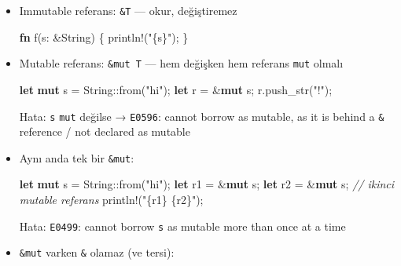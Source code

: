 \documentclass[12pt,a4paper]{article}
\newenvironment{Shaded}{}{}
\newcommand{\CommentTok}[1]{\textcolor[rgb]{0.38,0.63,0.69}{\textit{#1}}}
\newcommand{\DataTypeTok}[1]{\textcolor[rgb]{0.56,0.13,0.00}{#1}}
\newcommand{\FunctionTok}[1]{\textcolor[rgb]{0.02,0.16,0.49}{#1}}
\newcommand{\KeywordTok}[1]{\textcolor[rgb]{0.00,0.44,0.13}{\textbf{#1}}}
\newcommand{\NormalTok}[1]{#1}
\newcommand{\OperatorTok}[1]{\textcolor[rgb]{0.40,0.40,0.40}{#1}}
\newcommand{\StringTok}[1]{\textcolor[rgb]{0.25,0.44,0.63}{#1}}
\begin{document}
\begin{itemize}
\item
  Immutable referans: \texttt{\&T} --- okur, değiştiremez

\begin{Shaded}
\begin{Highlighting}[]
\KeywordTok{fn} \FunctionTok{f}\OperatorTok{(}\NormalTok{s}\OperatorTok{:} \OperatorTok{\&}\DataTypeTok{String}\OperatorTok{)} \OperatorTok{\{}\NormalTok{ println}\OperatorTok{!(}\StringTok{"\{s\}"}\OperatorTok{);} \OperatorTok{\}}
\end{Highlighting}
\end{Shaded}
\item
  Mutable referans: \texttt{\&mut\ T} --- hem değişken hem referans \texttt{mut} olmalı

\begin{Shaded}
\begin{Highlighting}[]
\KeywordTok{let} \KeywordTok{mut}\NormalTok{ s }\OperatorTok{=} \DataTypeTok{String}\OperatorTok{::}\FunctionTok{from}\OperatorTok{(}\StringTok{"hi"}\OperatorTok{);}
\KeywordTok{let}\NormalTok{ r }\OperatorTok{=} \OperatorTok{\&}\KeywordTok{mut}\NormalTok{ s}\OperatorTok{;}
\NormalTok{r}\OperatorTok{.}\FunctionTok{push\_str}\OperatorTok{(}\StringTok{"!"}\OperatorTok{);}
\end{Highlighting}
\end{Shaded}


  Hata: \texttt{s} \texttt{mut} değilse → \texttt{E0596}: cannot borrow as mutable, as it is behind a \texttt{\&} reference / not declared as mutable
\item
  Aynı anda tek bir \texttt{\&mut}:

\begin{Shaded}
\begin{Highlighting}[]
\KeywordTok{let} \KeywordTok{mut}\NormalTok{ s }\OperatorTok{=} \DataTypeTok{String}\OperatorTok{::}\FunctionTok{from}\OperatorTok{(}\StringTok{"hi"}\OperatorTok{);}
\KeywordTok{let}\NormalTok{ r1 }\OperatorTok{=} \OperatorTok{\&}\KeywordTok{mut}\NormalTok{ s}\OperatorTok{;}
\KeywordTok{let}\NormalTok{ r2 }\OperatorTok{=} \OperatorTok{\&}\KeywordTok{mut}\NormalTok{ s}\OperatorTok{;}      \CommentTok{// ikinci mutable referans}
\NormalTok{println}\OperatorTok{!(}\StringTok{"\{r1\} \{r2\}"}\OperatorTok{);}
\end{Highlighting}
\end{Shaded}


  Hata: \texttt{E0499}: cannot borrow \texttt{s} as mutable more than once at a time
\item
  \texttt{\&mut} varken \texttt{\&} olamaz (ve tersi):


\end{itemize}
\end{document}
